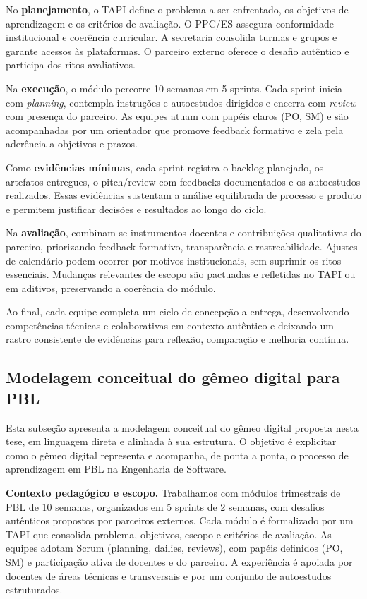 \documentclass[12pt,a4paper]{article}
\begin{document}
No \textbf{planejamento}, o TAPI define o problema a ser enfrentado, os objetivos de aprendizagem e os critérios de avaliação. O PPC/ES assegura conformidade institucional e coerência curricular. A secretaria consolida turmas e grupos e garante acessos às plataformas. O parceiro externo oferece o desafio autêntico e participa dos ritos avaliativos.

Na \textbf{execução}, o módulo percorre 10 semanas em 5 sprints. Cada sprint inicia com \emph{planning}, contempla instruções e autoestudos dirigidos e encerra com \emph{review} com presença do parceiro. As equipes atuam com papéis claros (PO, SM) e são acompanhadas por um orientador que promove feedback formativo e zela pela aderência a objetivos e prazos.

Como \textbf{evidências mínimas}, cada sprint registra o backlog planejado, os artefatos entregues, o pitch/review com feedbacks documentados e os autoestudos realizados. Essas evidências sustentam a análise equilibrada de processo e produto e permitem justificar decisões e resultados ao longo do ciclo.

Na \textbf{avaliação}, combinam‑se instrumentos docentes e contribuições qualitativas do parceiro, priorizando feedback formativo, transparência e rastreabilidade. Ajustes de calendário podem ocorrer por motivos institucionais, sem suprimir os ritos essenciais. Mudanças relevantes de escopo são pactuadas e refletidas no TAPI ou em aditivos, preservando a coerência do módulo.

Ao final, cada equipe completa um ciclo de concepção a entrega, desenvolvendo competências técnicas e colaborativas em contexto autêntico e deixando um rastro consistente de evidências para reflexão, comparação e melhoria contínua.

\subsection{Modelagem conceitual do gêmeo digital para PBL}

Esta subseção apresenta a modelagem conceitual do gêmeo digital proposta nesta tese, em linguagem direta e alinhada à sua estrutura. O objetivo é explicitar como o gêmeo digital representa e acompanha, de ponta a ponta, o processo de aprendizagem em PBL na Engenharia de Software.

\textbf{Contexto pedagógico e escopo.} Trabalhamos com módulos trimestrais de PBL de 10 semanas, organizados em 5 sprints de 2 semanas, com desafios autênticos propostos por parceiros externos. Cada módulo é formalizado por um TAPI que consolida problema, objetivos, escopo e critérios de avaliação. As equipes adotam Scrum (planning, dailies, reviews), com papéis definidos (PO, SM) e participação ativa de docentes e do parceiro. A experiência é apoiada por docentes de áreas técnicas e transversais e por um conjunto de autoestudos estruturados.
\end{document}
